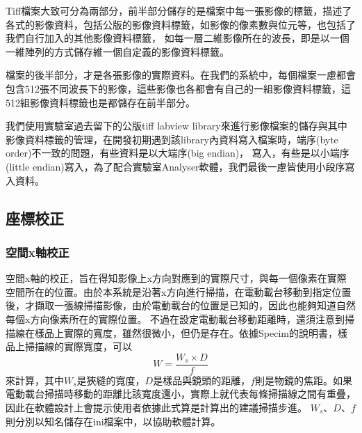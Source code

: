 \documentclass[12pt]{article}
\begin{document}
    Tiff檔案大致可分為兩部分，前半部分儲存的是檔案中每一張影像的標籤，描述了各式的影像資料，包括公版的影像資料標籤，如影像的像素數與位元等，也包括了我們自行加入的其他影像資料標籤，
    如每一層二維影像所在的波長，即是以一個一維陣列的方式儲存維一個自定義的影像資料標籤。

    檔案的後半部分，才是各張影像的實際資料。在我們的系統中，每個檔案一慮都會包含512張不同波長下的影像，這些影像也各都會有自己的一組影像資料標籤，這512組影像資料標籤也是都儲存在前半部分。

    我們使用實驗室過去留下的公版tiff labview library來進行影像檔案的儲存與其中影像資料標籤的管理，在開發初期遇到該library內資料寫入檔案時，端序(byte order)不一致的問題，有些資料是以大端序(big endian)，
    寫入，有些是以小端序(little endian)寫入，為了配合實驗室Analyser軟體，我們最後一慮皆使用小段序寫入資料。

    \subsection{座標校正}
    \subsubsection{空間x軸校正}
    空間x軸的校正，旨在得知影像上x方向對應到的實際尺寸，與每一個像素在實際空間所在的位置。由於本系統是沿著x方向進行掃描，在電動載台移動到指定位置後，才擷取一張線掃描影像，由於電動載台的位置是已知的，因此也能夠知道自然每個x方向像素所在的實際位置。
    不過在設定電動載台移動距離時，還須注意到掃描線在樣品上實際的寬度，雖然很微小，但仍是存在。依據Specim的說明書，樣品上掃描線的實際寬度，可以
    \begin{equation*}
        W=\frac{W_s\times D}{f}
    \end{equation*}
    來計算，其中$W_s$是狹縫的寬度，$D$是樣品與鏡頭的距離，$f$則是物鏡的焦距。如果電動載台掃描時移動的距離比該寬度還小，實際上就代表每條掃描線之間有重疊，因此在軟體設計上會提示使用者依據此式算是計算出的建議掃描步進。
    $W_s$、$D$、$f$則分別以知名儲存在ini檔案中，以協助軟體計算。
\end{document}
